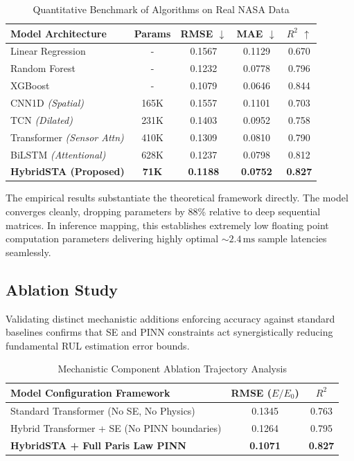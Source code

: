 \documentclass[conference]{IEEEtran}
\begin{document}
\begin{table}[htbp]
\centering
\caption{Quantitative Benchmark of Algorithms on Real NASA Data}
\label{tab:performance}
\begin{tabular}{@{}l c S[table-format=1.4] S[table-format=1.4] S[table-format=1.4]@{}}
\toprule
\textbf{Model Architecture} & \textbf{Params} & {\textbf{RMSE $\downarrow$}} & {\textbf{MAE $\downarrow$}} & {\textbf{$R^2$ $\uparrow$}} \\
\midrule
Linear Regression & - & 0.1567 & 0.1129 & 0.670 \\
Random Forest     & - & 0.1232 & 0.0778 & 0.796 \\
XGBoost           & - & 0.1079 & 0.0646 & 0.844 \\
\midrule
CNN1D \textit{(Spatial)} & 165K & 0.1557 & 0.1101 & 0.703 \\
TCN \textit{(Dilated)} & 231K & 0.1403 & 0.0952 & 0.758 \\
Transformer \textit{(Sensor Attn)} & 410K & 0.1309 & 0.0810 & 0.790 \\
BiLSTM \textit{(Attentional)} & 628K & 0.1237 & 0.0798 & 0.812 \\
\midrule
\textbf{HybridSTA (Proposed)} & \textbf{71K} & \textbf{0.1188} & \textbf{0.0752} & \textbf{0.827} \\
\bottomrule
\end{tabular}
\end{table}

The empirical results substantiate the theoretical framework directly. The model converges cleanly, dropping parameters by 88\% relative to deep sequential matrices. In inference mapping, this establishes extremely low floating point computation parameters delivering highly optimal $\sim \!2.4\,\text{ms}$ sample latencies seamlessly.

\subsection{Ablation Study}

Validating distinct mechanistic additions enforcing accuracy against standard baselines confirms that SE and PINN constraints act synergistically reducing fundamental RUL estimation error bounds. 

\begin{table}[htbp]
\centering
\caption{Mechanistic Component Ablation Trajectory Analysis}
\label{tab:ablation}
\begin{tabular}{@{}l S[table-format=1.4] S[table-format=1.4]@{}}
\toprule
\textbf{Model Configuration Framework} & \textbf{RMSE} ($E/E_0$) & \textbf{$R^2$} \\
\midrule
Standard Transformer (No SE, No Physics) & 0.1345 & 0.763 \\
Hybrid Transformer + SE (No PINN boundaries) & 0.1264 & 0.795 \\
\textbf{HybridSTA + Full Paris Law PINN} & \textbf{0.1071} & \textbf{0.827} \\
\bottomrule
\end{tabular}
\end{table}
\end{document}
